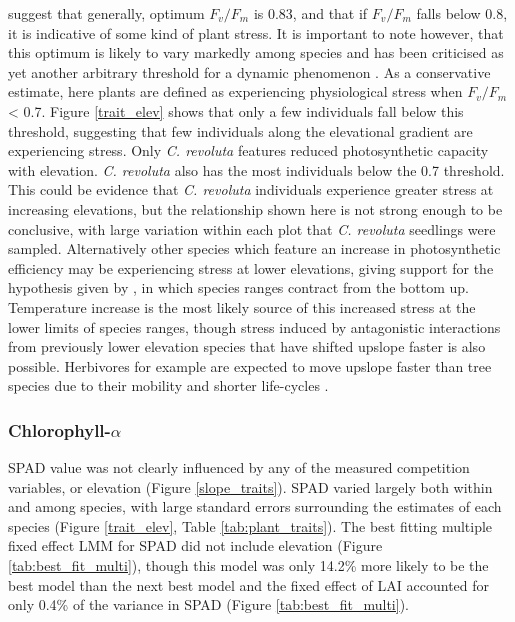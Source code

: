\documentclass[a4paper, 11pt]{article}
\newcommand{\textapprox}{\raisebox{0.5ex}{\texttildelow}}
\begin{document}
\citet{Maxwell2000} suggest that generally, optimum $F_v/F_m$ is \textapprox0.83, and that if $F_v/F_m$ falls below \textapprox0.8, it is indicative of some kind of plant stress. It is important to note however, that this optimum is likely to vary markedly among species and has been criticised as yet another arbitrary threshold for a dynamic phenomenon \citep{Ghouil2003}. As a conservative estimate, here plants are defined as experiencing physiological stress when $F_v/F_m$ \textless{} 0.7. Figure \ref{trait_elev} shows that only a few individuals fall below this threshold, suggesting that few individuals along the elevational gradient are experiencing stress. Only \textit{C. revoluta} features reduced photosynthetic capacity with elevation. \textit{C. revoluta} also has the most individuals below the 0.7 threshold. This could be evidence that \textit{C. revoluta} individuals experience greater stress at increasing elevations, but the relationship shown here is not strong enough to be conclusive, with large variation within each plot that \textit{C. revoluta} seedlings were sampled. Alternatively other species which feature an increase in photosynthetic efficiency may be experiencing stress at lower elevations, giving support for the hypothesis given by \citet{Campbell2007}, in which species ranges contract from the bottom up. Temperature increase is the most likely source of this increased stress at the lower limits of species ranges, though stress induced by antagonistic interactions from previously lower elevation species that have shifted upslope faster is also possible. Herbivores for example are expected to move upslope faster than tree species due to their mobility and shorter life-cycles \citep{Chen2011}.

\subsubsection*{Chlorophyll-$\alpha$}

SPAD value was not clearly influenced by any of the measured competition variables, or elevation (Figure \ref{slope_traits}). SPAD varied largely both within and among species, with large standard errors surrounding the estimates of each species (Figure \ref{trait_elev}, Table \ref{tab:plant_traits}). The best fitting multiple fixed effect LMM for SPAD did not include elevation (Figure \ref{tab:best_fit_multi}), though this model was only 14.2\% more likely to be the best model than the next best model and the fixed effect of LAI accounted for only 0.4\% of the variance in SPAD (Figure \ref{tab:best_fit_multi}). 
\end{document}

